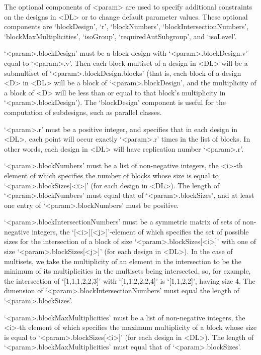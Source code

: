 The optional components of <param> are used to specify additional
constraints on the designs in <DL> or to change default parameter
values. These optional components are `blockDesign', `r', `blockNumbers',
`blockIntersectionNumbers', `blockMaxMultiplicities', `isoGroup',
`requiredAutSubgroup', and `isoLevel'.

`<param>.blockDesign' must  be a block design with `<param>.blockDesign.v'
equal to `<param>.v'. Then each block multiset of a design in <DL> will
be a submultiset of `<param>.blockDesign.blocks' (that is, each block of
a design <D> in <DL> will be a block of `<param>.blockDesign', and the
multiplicity of a block of <D> will be less than or equal to that block's
multiplicity in `<param>.blockDesign'). The `blockDesign' component is
useful for the computation of subdesigns, such as parallel classes.

`<param>.r' must be a positive integer, and specifies that in each design
in <DL>, each point will occur exactly `<param>.r' times in the list of
blocks. In other words, each design in <DL> will have replication number
`<param>.r'.

`<param>.blockNumbers' must be a list of non-negative integers, the <i>-th
element of which specifies the number of blocks whose size is equal
to `<param>.blockSizes[<i>]' (for each design in <DL>). The length of
`<param>.blockNumbers' must equal that of `<param>.blockSizes', and at
least one entry of `<param>.blockNumbers' must be positive.

`<param>.blockIntersectionNumbers' must be a symmetric matrix of sets
of non-negative integers, the `[<i>][<j>]'-element of which specifies
the set of possible sizes for the intersection of a block of size
`<param>.blockSizes[<i>]' with one of size `<param>.blockSizes[<j>]' (for
each design in <DL>). In the case of multisets, we take the multiplicity
of an element in the intersection to be the minimum of its multiplicities
in the multisets being intersected, so, for example, the intersection of
`[1,1,1,2,2,3]' with `[1,1,2,2,2,4]' is `[1,1,2,2]', having size 4. The
dimension of `<param>.blockIntersectionNumbers' must equal the length of
`<param>.blockSizes'.

`<param>.blockMaxMultiplicities' must be a list of non-negative integers,
the <i>-th element of which specifies the maximum multiplicity of a block
whose size is equal to `<param>.blockSizes[<i>]' (for each design in
<DL>). The length of `<param>.blockMaxMultiplicities' must equal that of
`<param>.blockSizes'.

